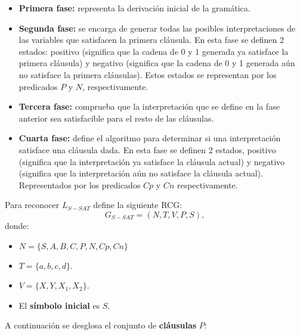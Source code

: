 \begin{itemize}
    \item \textbf{Primera fase:} representa la derivación inicial de la gramática.
    \item \textbf{Segunda fase:} se encarga de generar todas las posibles interpretaciones
          de las variables que satisfacen la primera cláusula. En esta fase se definen 2 estados: positivo (significa
          que la cadena de 0 y 1 generada ya satisface la primera cláusula) y negativo (significa que la cadena de 0 y 1
          generada aún no satisface la primera cláusulas). Estos estados se representan por los predicados $P$ y $N$, respectivamente.
          
    \item \textbf{Tercera fase:} comprueba que la interpretación que se define en la fase anterior sea satisfacible para
          el resto de las cláusulas.
    \item \textbf{Cuarta fase:} define el algoritmo para determinar si una interpretación satisface una cláusula
          dada. En esta fase se definen 2 estados, positivo (significa que la interpretación ya satisface la cláusula
          actual) y negativo (significa que la interpretación aún no satisface la cláusula actual). Representados por
          los predicados $Cp$ y $Cn$ respectivamente.
          
\end{itemize}



Para reconocer $L_{S-SAT}$ define la siguiente RCG:
\[
    G_{S-SAT} = (N, T, V, P, S),
\]
donde:

\begin{itemize}
    \item $N=\{S,A,B,C,P,N,Cp,Cn\}$
    \item $T=\{a,b,c,d\}$.
    \item $V=\{X,Y,X_1,X_2\}$.
    \item El \textbf{símbolo inicial} es $S$.
\end{itemize}

A continuación se desglosa el conjunto de \textbf{cláusulas} $P$:

